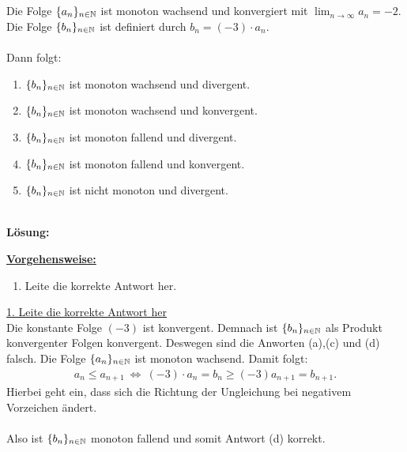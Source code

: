 \subsection*{}
Die Folge $ \lbrace a_n \rbrace_{n \in \mathbb{N}} $ ist monoton wachsend und konvergiert mit $ \lim_{n \to \infty} a_n = -2 $.
Die Folge $ \lbrace b_n \rbrace_{n \in \mathbb{N}} $ ist definiert durch $ b_n = (-3) \cdot a_n $.\\
\\
Dann folgt:
\renewcommand{\labelenumi}{(\alph{enumi})}
\begin{enumerate}
	\item $ \lbrace b_n \rbrace_{n \in \mathbb{N}} $ ist monoton wachsend und divergent.
	\item $ \lbrace b_n \rbrace_{n \in \mathbb{N}} $ ist monoton wachsend und konvergent.
	\item $ \lbrace b_n \rbrace_{n \in \mathbb{N}} $ ist monoton fallend und divergent.
	\item $ \lbrace b_n \rbrace_{n \in \mathbb{N}} $ ist monoton fallend und konvergent.
	\item $ \lbrace b_n \rbrace_{n \in \mathbb{N}} $ ist nicht monoton und divergent.
\end{enumerate}
\ \\
\textbf{Lösung:}
\begin{mdframed}
	\underline{\textbf{Vorgehensweise:}}
	\renewcommand{\labelenumi}{\theenumi.}
	\begin{enumerate}
		\item Leite die korrekte Antwort her.
	\end{enumerate}
\end{mdframed}
\underline{1. Leite die korrekte Antwort her}\\
Die konstante Folge $ (-3) $ ist konvergent. Demnach ist $ \lbrace b_n \rbrace_{n \in \mathbb{N}} $ als Produkt konvergenter Folgen konvergent.
Deswegen sind die Anworten (a),(c) und (d) falsch.
Die Folge $\lbrace a_n \rbrace_{n \in \mathbb{N}}$ ist monoton wachsend.
Damit folgt:
\begin{align*}
	a_n \leq a_{n+1}
	\ \Leftrightarrow \
	(-3) \cdot a_n = b_n \geq (-3 ) a_{n+1} = b_{n+1}.
\end{align*} 
Hierbei geht ein, dass sich die Richtung der Ungleichung bei negativem Vorzeichen ändert.\\
\\
Also ist $ \lbrace b_n \rbrace_{n \in \mathbb{N}} $ monoton fallend und somit Antwort (d) korrekt.
 

\newpage
